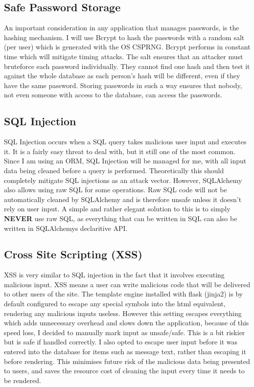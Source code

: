 \documentclass[a4paper,oneside,12pt]{report}
\begin{document}
	\subsection{Safe Password Storage}
	An important consideration in any application that manages passwords, is the hashing mechanism. I will use Bcrypt to hash the passwords with a random salt (per user) which is generated with the OS CSPRNG. Bcrypt performs in constant time which will mitigate timing attacks. The salt ensures that an attacker must bruteforce each password individually. They cannot find one hash and then test it against the whole database as each person's hash will be different, even if they have the same password. Storing passwords in such a way ensures that nobody, not even someone with access to the database, can access the passwords.

	\subsection{SQL Injection}
	SQL Injection occurs when a SQL query takes malicious user input and executes it. It is a fairly easy threat to deal with, but it still one of the most common. Since I am using an ORM, SQL Injection will be managed for me, with all input data being cleaned before a query is performed. Theoretically this should completely mitigate SQL injections as an attack vector. However, SQLAlchemy also allows using raw SQL for some operations. Raw SQL code will not be automatically cleaned by SQLAlchemy and is therefore unsafe unless it doesn’t rely on user input. A simple and rather elegant solution to this is to simply \textbf{NEVER} use raw SQL, as everything that can be written in SQL can also be written in SQLAlchemys declaritive API.

	\subsection{Cross Site Scripting (XSS)}
	XSS is very similar to SQL injection in the fact that it involves executing malicious input. XSS means a user can write malicious code that will be delivered to other users of the site. The template engine installed with flask (jinja2) is by default configured to escape any special symbols into the html equivalent, rendering any malicious inputs useless. However this setting escapes everything which adds unnecessary overhead and slows down the application, because of this speed loss, I decided to manually mark input as unsafe/safe. This is a bit riskier but is safe if handled correctly. I also opted to escape user input before it was entered into the database for items such as message text, rather than escaping it before rendering. This minimises future risk of the malicious data being presented to users, and saves the resource cost of cleaning the input every time it needs to be rendered.
\end{document}
